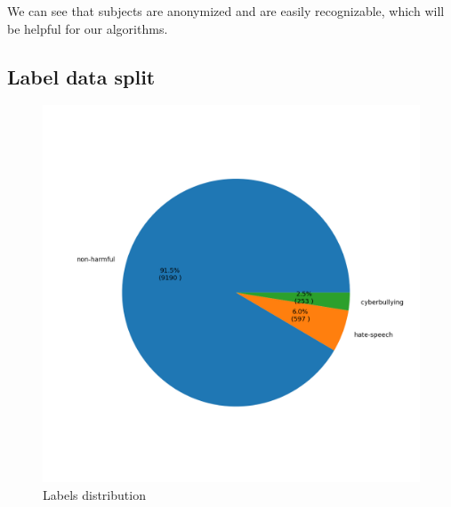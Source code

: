 \documentclass[a4paper]{article}
\begin{document}
We can see that subjects are anonymized and are easily recognizable, which will be helpful for our algorithms.

\newpage
\subsection{Label data split}
\begin{figure}[h]
\centering
\includegraphics[width=\textwidth]{plots/tags_pie_plot.png}
\caption{Labels distribution}
\end{figure}

\newpage
\end{document}
